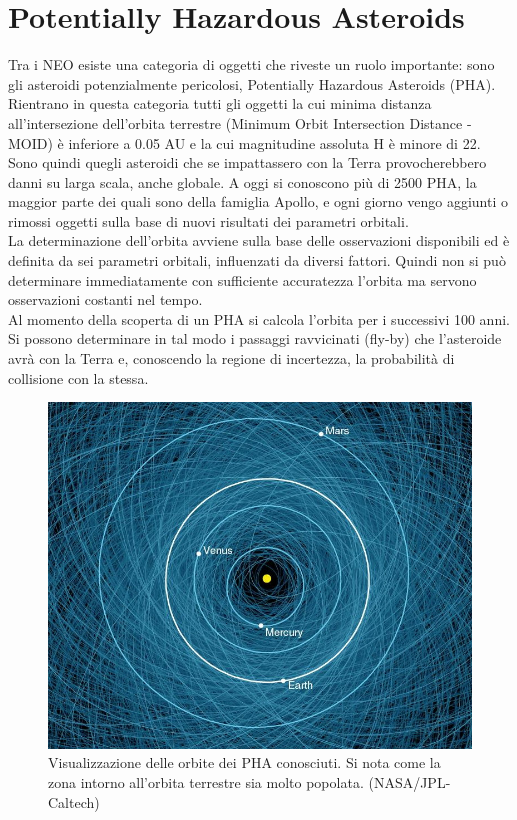 \documentclass[a4paper,11pt,openright]{book}
\begin{document}
\section{Potentially Hazardous Asteroids}\label{sec:pha}
Tra i NEO esiste una categoria di oggetti che riveste un ruolo importante: sono gli asteroidi potenzialmente pericolosi, Potentially Hazardous Asteroids (PHA). Rientrano in questa categoria tutti gli oggetti la cui minima distanza all'intersezione dell'orbita terrestre (Minimum Orbit Intersection Distance - MOID) è inferiore a 0.05 AU e la cui magnitudine assoluta H è minore di 22. Sono quindi quegli asteroidi che se impattassero con la Terra provocherebbero danni su larga scala, anche globale. A oggi si conoscono più di 2500 PHA, la maggior parte dei quali sono della famiglia Apollo, e ogni giorno vengo aggiunti o rimossi oggetti sulla base di nuovi risultati dei parametri orbitali.\\
La determinazione dell'orbita avviene sulla base delle osservazioni disponibili ed è definita da sei parametri orbitali, influenzati da diversi fattori. Quindi non si può determinare immediatamente con sufficiente accuratezza l'orbita ma servono osservazioni costanti nel tempo.\\
Al momento della scoperta di un PHA si calcola l'orbita per i successivi 100 anni. Si possono determinare in tal modo i passaggi ravvicinati (fly-by) che l'asteroide avrà con la Terra e, conoscendo la regione di incertezza, la probabilità di collisione con la stessa.

\begin{figure}
    \centering
    \includegraphics[scale=0.35]{figure/pha_map.jpg}
    \caption[Visualizzazione delle orbite dei PHA conosciuti.]{Visualizzazione delle orbite dei PHA conosciuti. Si nota come la zona intorno all'orbita terrestre sia molto popolata. (NASA/JPL-Caltech)}
    \label{fig:pha_map}
\end{figure}
\end{document}
